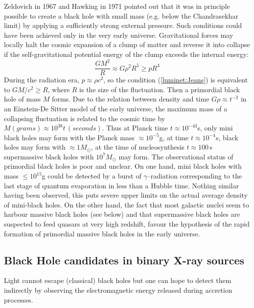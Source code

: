 \documentclass[12pt]{article}
\begin{document}
Zeldovich in 1967 and Hawking in 1971 pointed out that it was in principle 
possible to create a
black hole with small mass (e.g. below the Chandrasekhar limit) by applying 
a sufficiently strong external
pressure. Such conditions could have been achieved only in the very early universe. 
Gravitational forces may locally halt the cosmic expansion of a clump of 
matter and reverse it
into collapse if the self-gravitational potential energy of the clump exceeds the internal
energy:
\begin{equation}
\frac{GM^2}{R}  \approx G\rho ^2 R^5 \geq pR^3 \label{luminet:Jeans}
\end{equation}
 During the radiation era, $p \approx
\rho c^2$, so the condition (\ref{luminet:Jeans}) is equivalent 
to $GM/c^2 \geq R$, where $R$ is the size of the fluctuation. Then a primordial 
black hole of mass $M$
forms. Due to the relation between density and time $G\rho \approx t^{-2}$ in 
an Einstein-De Sitter model 
of the early universe, the maximum mass of a
collapsing fluctuation is related to the cosmic time by $M(grams) \approx 
10^{38} t \,(seconds)$. 
Thus at Planck time $t \approx 10^{-43}$s, only mini black holes may form with the Planck mass
$\approx 10^{-5}$g, at time $t  \approx 10^{-4}$s, black holes may form with
$\approx 1 M_{\odot}$, at the time of nucleosynthesis $t \approx 100 
\,$s supermassive
black holes with $10^7 M_{\odot}$ may form.
The observational status of primordial black holes is poor and 
unclear. On one hand, mini black holes with mass $\leq 10^{15}$g could be detected by a burst of
$\gamma$--radiation corresponding to the last stage of quantum evaporation in less than a
Hubble time. Nothing similar having been observed, this puts severe upper limits on the actual
average density of mini-black holes. On the other hand, the fact that most 
galactic nuclei seem to harbour massive black holes (see below) and that 
supermassive black holes are suspected to feed
quasars at very high redshift, favour the hypothesis of the rapid formation 
of primordial massive black holes in
the early universe.

\subsection {Black Hole candidates in binary X-ray sources}

Light cannot escape (classical) black holes but one can hope to detect 
them indirectly by observing the electromagnetic energy released 
during accretion processes.
\end{document}
